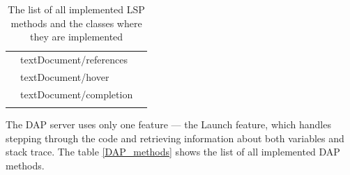\begin{table}
\begin{tabular}{lll}
		                                                                                                                     & textDocument/references              \\
		                                                                                                                     & textDocument/hover                   \\
		                                                                                                                     & textDocument/completion              \\ \bottomrule& 
	\end{tabular}
	\caption{The list of all implemented LSP methods and the classes where they are implemented}
	\label{LSP_methods}
\end{table}

The DAP server uses only one feature --- the Launch feature, which handles stepping through the code and retrieving information about both variables and stack trace. The table \cref{DAP_methods} shows the list of all implemented DAP methods.

